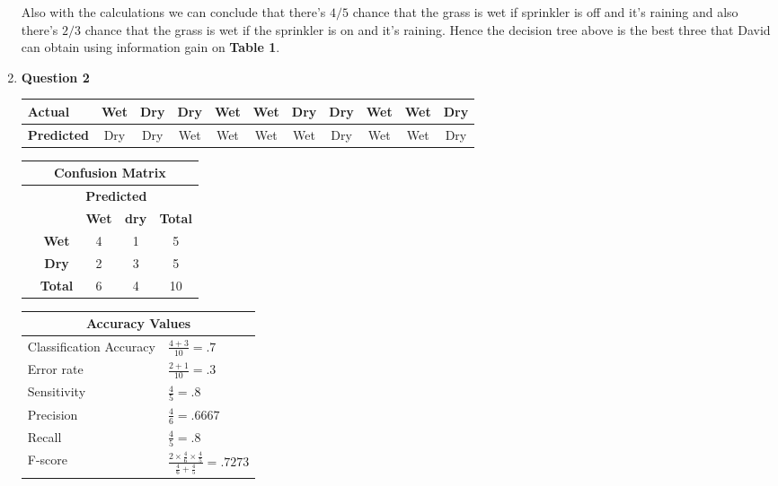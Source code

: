 \documentclass[10pt,a4paper]{article}
\begin{document}
\begin{enumerate}
		Also with the calculations we can conclude that there's $ 4/5 $ chance that the grass is wet if sprinkler is off and it's raining and also there's $ 2/3 $ chance that the grass is wet if the sprinkler is on and it's raining. Hence the decision tree above is the best three that David can obtain using information gain on \textbf{Table 1}.
		
		
		\clearpage
		\item \textbf{Question 2} \newline
			\begin{table}[h!]
				\centering
				\begin{tabular}{l|cccccccccc}
					\textbf{Actual} & Wet & Dry & Dry & Wet & Wet & Dry & Dry & Wet & Wet & Dry \\ \hline
					\textbf{Predicted} & Dry & Dry & Wet & Wet & Wet & Wet & Dry & Wet & Wet & Dry 
				\end{tabular}
			\end{table}
		
		\begingroup
		\renewcommand{\arraystretch}{1.5}
			\begin{table}[h!]
				\centering
				\begin{tabular}{c|c|c|c|c|}
					\multicolumn{5}{c}{\textbf{Confusion Matrix}} \\ \toprule
					\multicolumn{1}{c}{ \multirow{6}{*}{\rotatebox{90}{\textbf{Actual}}} } & \multicolumn{1}{c}{} & \multicolumn{2}{c}{\textbf{Predicted}} & \multicolumn{1}{c}{} \\ \cline{3-5}
					\multicolumn{1}{c}{} & & \textbf{Wet} & \textbf{dry} & \textbf{Total} \\ \cline{2-5}
					& \textbf{Wet} & 4 & 1 & 5 \\ 
					& \textbf{Dry} & 2 & 3 & 5 \\ \cline{2-5}
					& \textbf{Total} & 6 & 4 & 10 \\ \cline{2-5}
				\end{tabular}
			\end{table}
		
			\begin{table}[h!]
				\centering
				\begin{tabular}{l|l}
					\multicolumn{2}{c}{Accuracy Values} \\ \toprule
					Classification Accuracy & $\frac{4 + 3}{10} = .7 $ \\
					Error rate & $\frac{2 + 1}{10} = .3 $ \\
					Sensitivity & $\frac{4}{5} = .8 $ \\
					Precision & $\frac{4}{6} = .6667 $ \\
					Recall & $\frac{4}{5} = .8 $ \\
					F-score & $\frac{2 \times \frac{4}{6} \times \frac{4}{5} }{\frac{4}{6} + \frac{4}{5} } = .7273 $ \\ \bottomrule
				\end{tabular}
			\end{table}
		\endgroup
		

\end{enumerate}
\end{document}
